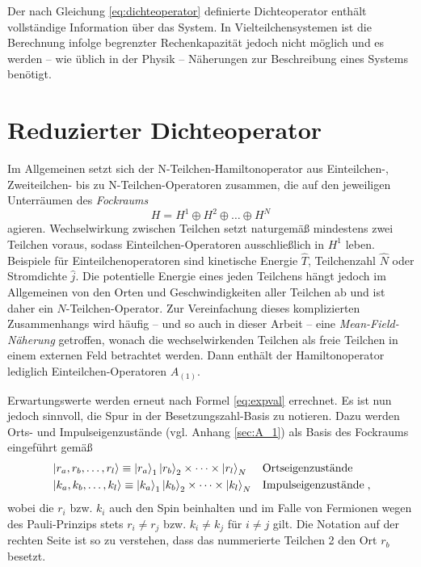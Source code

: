 Der nach Gleichung \eqref{eq:dichteoperator} definierte Dichteoperator enthält vollständige Information über das System. In Vielteilchensystemen ist die Berechnung infolge begrenzter Rechenkapazität jedoch nicht möglich und es werden -- wie üblich in der Physik -- Näherungen zur Beschreibung eines Systems benötigt.

\section{Reduzierter Dichteoperator}
Im Allgemeinen setzt sich der N-Teilchen-Hamiltonoperator aus Einteilchen-, Zweiteilchen- bis zu N-Teilchen-Operatoren zusammen, die auf den jeweiligen Unterräumen des \emph{Fockraums} 
\begin{equation*}
  H = H^1 \oplus H^2 \oplus \dots \oplus H^N
\end{equation*}
agieren. Wechselwirkung zwischen Teilchen setzt naturgemäß mindestens zwei Teilchen voraus, sodass Einteilchen-Operatoren ausschließlich in $H^1$ leben. Beispiele für Einteilchenoperatoren sind kinetische Energie $\hat{T}$, Teilchenzahl $\hat{N}$ oder Stromdichte $\hat{j}$. Die potentielle Energie eines jeden Teilchens hängt jedoch im Allgemeinen von den Orten und Geschwindigkeiten aller Teilchen ab und ist daher ein $N$-Teilchen-Operator. Zur Vereinfachung dieses komplizierten Zusammenhangs wird häufig -- und so auch in dieser Arbeit -- eine  \emph{Mean-Field-Näherung} getroffen, wonach die wechselwirkenden Teilchen als freie Teilchen in einem externen Feld betrachtet werden. Dann enthält der Hamiltonoperator lediglich Einteilchen-Operatoren $\hat{A}_{(1)}$.

Erwartungswerte werden erneut nach Formel \eqref{eq:expval} errechnet. Es ist nun jedoch sinnvoll, die Spur in der Besetzungszahl-Basis zu notieren. Dazu werden Orts- und Impulseigenzustände (vgl. Anhang \ref{sec:A_1}) als Basis des Fockraums eingeführt gemäß
\begin{align*}
  &\ket{r_a,r_b, \dots, r_l} \equiv \ket{r_a}_1 \ket{r_b}_2 \times \dots \times \ket{r_l}_N  & &\text{Ortseigenzustände} \\
  &\ket{k_a,k_b, \dots, k_l} \equiv \ket{k_a}_1 \ket{k_b}_2 \times \dots \times \ket{k_l}_N  & &\text{Impulseigenzustände} \; ,
\end{align*}
wobei die $r_i$ bzw. $k_i$ auch den Spin beinhalten und im Falle von Fermionen wegen des Pauli-Prinzips stets $r_i\neq r_j$ bzw. $k_i \neq k_j$ für $i\neq j$ gilt. Die Notation auf der rechten Seite ist so zu verstehen, dass das nummerierte Teilchen 2 den Ort $r_b$ besetzt.

